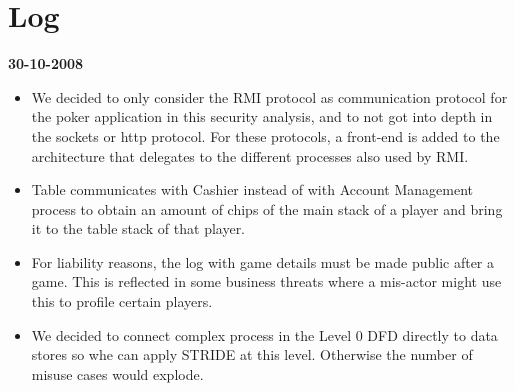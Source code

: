 \documentclass[a4paper,11pt]{report}
\begin{document}
\section{Log}
\textbf{30-10-2008}
\begin{itemize}
\item We decided to only consider the RMI protocol as communication protocol for the poker application in this 
security analysis, and to not got into depth in the sockets or http protocol. For these protocols, a front-end is added to the architecture that delegates to the different processes also used by RMI.
\item Table communicates with Cashier instead of with Account Management process to obtain an amount of chips
of the main stack of a player and bring it to the table stack of that player.
\item For liability reasons, the log with game details must be made public after a game. This is reflected in some
business threats where a mis-actor might use this to profile certain players.
\item We decided to connect complex process in the Level 0 DFD directly to data stores so whe can apply STRIDE
at this level. Otherwise the number of misuse cases would explode.
\end{itemize}

\nocite{1202957}
\nocite{citeulike:174301}


\end{document}
